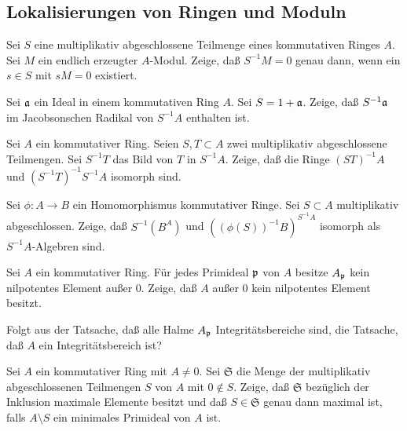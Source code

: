 \subsection{Lokalisierungen von Ringen und Moduln}

\begin{exercise}
	Sei \(S\) eine multiplikativ abgeschlossene Teilmenge eines kommutativen Ringes \(A\).
	Sei \(M\) ein endlich erzeugter \(A\)-Modul. Zeige, daß \(S^{-1} M = 0\) genau dann, wenn
	ein \(s \in S\) mit \(s M = 0\) existiert.
\end{exercise}

\begin{exercise}
	Sei \(\mathfrak{a}\) ein Ideal in einem kommutativen Ring \(A\). Sei \(S = 1 + \mathfrak{a}\). Zeige, daß
	\(S^{-1} \mathfrak{a}\) im Jacobsonschen Radikal von \(S^{-1} A\) enthalten ist.
\end{exercise}

\begin{exercise}
	Sei \(A\) ein kommutativer Ring. Seien \(S, T \subset A\) zwei multiplikativ abgeschlossene
	Teilmengen. Sei \(S^{-1} T\) das Bild von \(T\) in \(S^{-1} A\). Zeige, daß die Ringe
	\((ST)^{-1} A\) und \((S^{-1} T)^{-1} S^{-1} A\) isomorph sind.
\end{exercise}

\begin{exercise}
	Sei \(\phi\colon A \to B\) ein Homomorphismus kommutativer Ringe. Sei \(S \subset A\) multiplikativ
	abgeschlossen. Zeige, daß \(S^{-1} (B^A)\) und \(((\phi(S))^{-1} B)^{S^{-1} A}\) isomorph als
	\(S^{-1} A\)-Algebren sind.
\end{exercise}

\begin{exercise}
	Sei \(A\) ein kommutativer Ring. Für jedes Primideal \(\mathfrak{p}\) von \(A\) besitze \(A_{\mathfrak{p}}\) kein
	nilpotentes Element außer \(0\). Zeige, daß \(A\) außer \(0\) kein nilpotentes Element besitzt.
	
	Folgt aus der Tatsache, daß alle Halme \(A_{\mathfrak{p}}\) Integritätsbereiche sind, die Tatsache, daß \(A\)
	ein Integritätsbereich ist?
\end{exercise}

\begin{exercise}
	\label{exer:max_mult_closed}
	Sei \(A\) ein kommutativer Ring mit \(A \neq 0\). Sei \(\mathfrak S\) die Menge der multiplikativ abgeschlossenen
	Teilmengen \(S\) von \(A\) mit \(0 \notin S\). Zeige, daß \(\mathfrak S\) bezüglich der Inklusion maximale Elemente
	besitzt und daß \(S \in \mathfrak S\) genau dann maximal ist, falls \(A \setminus S\) ein minimales Primideal von \(A\)
	ist.
\end{exercise}

